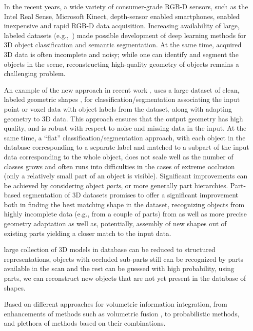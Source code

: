 In the recent years, a wide variety of consumer-grade RGB-D sensors, such as the Intel Real Sense, Microsoft Kinect, depth-sensor enabled smartphones, enabled inexpensive and rapid RGB-D data acquisition. Increasing availability of large, labeled datasets (e.g.,~\cite{chang2017matterport3d,dai2017scannet})  made possible development of deep learning methods for 3D object classification and semantic segmentation. At the same time, acquired 3D data is often incomplete and noisy; while one can identify and segment the objects in the scene, reconstructing high-quality geometry of objects remains a challenging problem.  

An example of the new approach in recent work 
\cite{avetisyan2019scan2cad}, uses a large dataset of clean, labeled geometric shapes
\cite{chang2015shapenet}, for classification/segmentation associating the input point or voxel data with object labels from the dataset, along with adapting geometry to 3D data.  This approach ensures that the output geometry has high quality, and is robust with respect to noise and missing data in the input.  
At the same time, a ``flat'' classification/segmentation approach, with each object in the database corresponding to a separate label and matched to a subpart of the input data corresponding to the whole object, does not scale well as the number of classes grows and often runs into difficulties in the cases of extreme occlusion (only a relatively small part of an object is visible). 
Significant improvements can be achieved by considering object \emph{parts}, or more generally part hierarchies. 
Part-based segmentation of 3D datasets promises to offer a significant improvement both in finding the best matching shape in the dataset, recognizing objects from  highly incomplete data (e.g., from a couple of parts) from  as well as more precise geometry adaptation as well as, potentially, assembly of new shapes out of existing parts yielding a closer match to the input data. 

large collection of 3D models in database can be reduced to structured representations, 
objects with occluded sub-parts still can be recognized by parts available in the scan and the rest can be guessed with high probability, using parts, we can reconstruct new objects that are not yet present in the database of shapes.

Based on different approaches for volumetric information integration, from enhancements of  methods such as volumetric fusion \cite{curless1996volumetric}, to probabilistic  methods, and plethora of methods based on their combinations.

